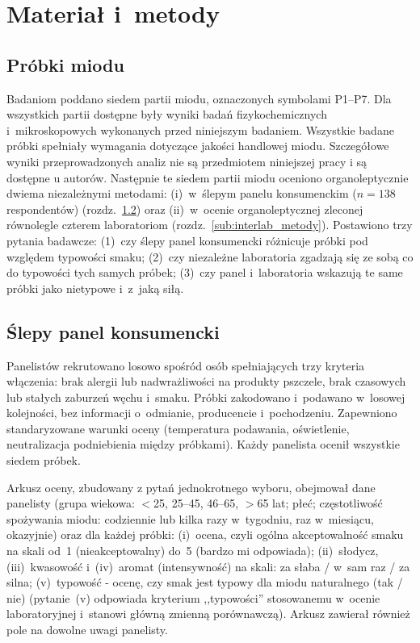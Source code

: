 \section{Materiał i~metody}

\subsection{Próbki miodu}
\label{sub:probki}

Badaniom poddano siedem partii miodu, oznaczonych symbolami P1--P7.
Dla wszystkich partii dostępne były wyniki badań fizykochemicznych
i~mikroskopowych wykonanych przed niniejszym badaniem. 
Wszystkie badane próbki spełniały wymagania dotyczące jakości handlowej miodu\cite{RozporzadzenieMRiRW2003}. Szczegółowe wyniki przeprowadzonych analiz nie są przedmiotem niniejszej pracy i są dostępne u autorów.
Następnie te  siedem partii miodu oceniono organoleptycznie dwiema
niezależnymi metodami: (i)~w~ślepym panelu konsumenckim ($n = 138$
respondentów) (rozdz.~\ref{sub:dobor_panelu}) oraz (ii)~w~ocenie organoleptycznej zleconej równolegle
czterem laboratoriom (rozdz.~\ref{sub:interlab_metody}). Postawiono trzy pytania badawcze: (1)~czy ślepy panel konsumencki
różnicuje próbki pod względem typowości smaku; (2)~czy niezależne
laboratoria zgadzają się ze sobą co do typowości tych samych próbek; (3)~czy
panel i~laboratoria wskazują te same próbki jako nietypowe i~z~jaką siłą.



\subsection{Ślepy panel konsumencki}
\label{sub:dobor_panelu}

Panelistów rekrutowano losowo spośród osób spełniających trzy kryteria
włączenia: brak alergii lub nadwrażliwości na produkty pszczele, brak
czasowych lub stałych zaburzeń węchu i~smaku. Próbki zakodowano i~podawano
w~losowej kolejności, bez informacji o~odmianie, producencie
i~pochodzeniu. Zapewniono standaryzowane warunki oceny (temperatura podawania,
oświetlenie, neutralizacja podniebienia między próbkami). Każdy panelista
ocenił wszystkie siedem próbek.

Arkusz oceny, zbudowany z pytań jednokrotnego wyboru, obejmował dane panelisty (grupa wiekowa: $<$25, 25--45, 46--65,
$>$65 lat; płeć; częstotliwość spożywania miodu: codziennie lub kilka razy
w~tygodniu, raz w~miesiącu, okazyjnie) oraz dla każdej próbki:
(i)~ocena, czyli ogólna akceptowalność smaku na skali od~1 (nieakceptowalny) do~5
(bardzo mi odpowiada); (ii)~słodycz, (iii)~kwasowość i~(iv)~aromat (intensywność)
 na skali: za słaba / w~sam raz / za silna; (v)~typowość - ocenę, czy smak jest
typowy dla miodu naturalnego (tak / nie) (pytanie~(v) odpowiada kryterium
,,typowości'' stosowanemu w~ocenie laboratoryjnej i~stanowi główną zmienną
porównawczą). Arkusz zawierał również pole na dowolne uwagi panelisty.


